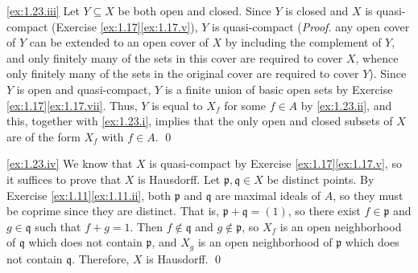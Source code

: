 \noindent
\ref{ex:1.23.iii}
Let $Y \subseteq X$ be both open and closed.
Since $Y$ is closed and $X$ is quasi-compact (Exercise \ref{ex:1.17}\ref{ex:1.17.v}), $Y$ is quasi-compact (\emph{Proof.} any open cover of $Y$ can be extended to an open cover of $X$ by including the complement of $Y$, and only finitely many of the sets in this cover are required to cover $X$, whence only finitely many of the sets in the original cover are required to cover $Y$).
Since $Y$ is open and quasi-compact, $Y$ is a finite union of basic open sets by Exercise \ref{ex:1.17}\ref{ex:1.17.vii}.
Thus, $Y$ is equal to $X_f$ for some $f\in A$ by \ref{ex:1.23.ii}, and this, together with \ref{ex:1.23.i}, implies that the only open and closed subsets of $X$ are of the form $X_f$ with $f\in A$.
\qed

\noindent
\ref{ex:1.23.iv}
We know that $X$ is quasi-compact by Exercise \ref{ex:1.17}\ref{ex:1.17.v}, so it suffices to prove that $X$ is Hausdorff.
Let $\mathfrak p,\mathfrak q \in X$ be distinct points.
By Exercise \ref{ex:1.11}\ref{ex:1.11.ii}, both $\mathfrak p$ and $\mathfrak q$ are maximal ideals of $A$, so they must be coprime since they are distinct.
That is, $\mathfrak p + \mathfrak q = (1)$, so there exist $f\in\mathfrak p$ and $g \in \mathfrak q$ such that $f + g = 1$.
Then $f \notin \mathfrak q$ and $g \notin \mathfrak p$, so $X_f$ is an open neighborhood of $\mathfrak q$ which does not contain $\mathfrak p$, and $X_g$ is an open neighborhood of $\mathfrak p$ which does not contain $\mathfrak q$.
Therefore, $X$ is Hausdorff.
\qed



